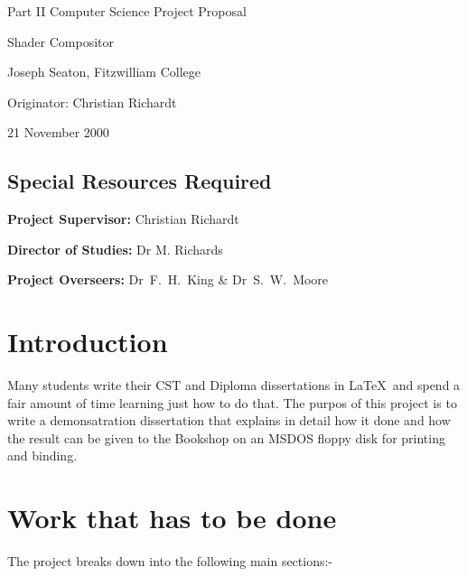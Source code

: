 

\vfil

\centerline{\Large Part II Computer Science Project Proposal}
\vspace{0.4in}
\centerline{\Large Shader Compositor }
\vspace{0.4in}
\centerline{\large Joseph Seaton, Fitzwilliam College}
\vspace{0.3in}
\centerline{\large Originator: Christian Richardt}
\vspace{0.3in}
\centerline{\large 21 November 2000}

\vfil

\subsection*{Special Resources Required}

\vspace{0.2in}

\noindent
{\bf Project Supervisor:} Christian Richardt
\vspace{0.2in}

\noindent
{\bf Director of Studies:} Dr M. Richards
\vspace{0.2in}
\noindent
 
\noindent
{\bf Project Overseers:} Dr~F.~H.~King  \& Dr~S.~W.~Moore

\vfil
\pagebreak


\section*{Introduction}

Many students write their CST and Diploma dissertations in \LaTeX\ and
spend a fair amount of time learning just how to do that. The purpos of 
this project is to write a demonsatration dissertation that explains in
detail how it done and how the result can be given to the Bookshop
on an MSDOS floppy disk for printing and binding.

\section*{Work that has to be done}

The project breaks down into the following main sections:-


